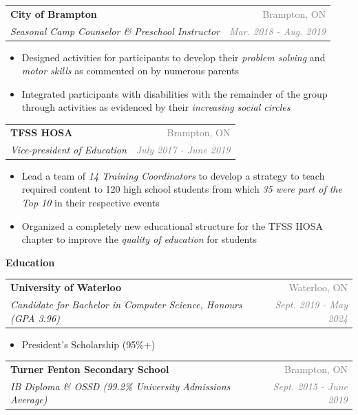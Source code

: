 \documentclass[letterpaper,11pt]{article}
\makeatletter
\newcommand{\resheading}[1]{{\large \colorbox{LightMidnightBlue}{\begin{minipage}{\textwidth}{\textbf{\textrm{#1 \vphantom{p\^{E}}}}}\end{minipage}}}}
\newcommand{\ressubheading}[4]{
\begin{tabular*}{7in}{l@{\extracolsep{\fill}}r}
        \textbf{#1} & \textcolor{gray}{#2} \\
        \textit{#3} & \textcolor{gray}{\textit{#4}} \\
\end{tabular*}\vspace{-6pt}}
\makeatother
\begin{document}
    \ressubheading{City of Brampton}{Brampton, ON}{Seasonal Camp Counselor \& Preschool Instructor}{Mar. 2018 - Aug. 2019}
        \begin{itemize}
        \setlength\itemsep{0.75mm}
            \item Designed activities for participants to develop their \textit{problem solving} and \textit{motor skills} as commented on by numerous parents
            \item Integrated participants with disabilities with the remainder of the group through activities as evidenced by their \textit{increasing social circles}
        \end{itemize}
    
    \ressubheading{TFSS HOSA}{Brampton, ON}{Vice-president of Education}{July 2017 - June 2019}
    \begin{itemize}
    \setlength\itemsep{0.75mm}
        \item Lead a team of \textit{14 Training Coordinators} to develop a strategy to teach required content to 120 high school students from which \textit{35 were part of the Top 10} in their respective events
        \item Organized a completely new educational structure for the TFSS HOSA chapter to improve the \textit{quality of education} for students
    \end{itemize}

\resheading{Education}

\vspace{2mm}

\ressubheading{University of Waterloo}{Waterloo, ON}{Candidate for Bachelor in Computer Science, Honours (GPA 3.96)}{Sept. 2019 - May 2024}

\begin{itemize}
    \item President's Scholarship (95\%+)
\end{itemize}

\ressubheading{Turner Fenton Secondary School}{Brampton, ON}{IB Diploma \& OSSD (99.2\% University Admissions Average)}{Sept. 2015 - June 2019}
\end{document}
